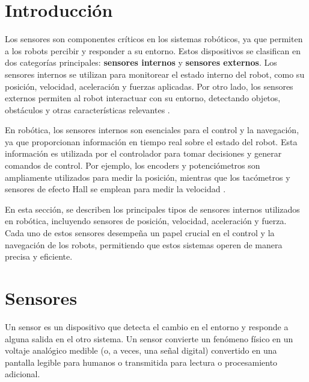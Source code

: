 \section{Introducción}

Los sensores son componentes críticos en los sistemas robóticos, ya que permiten a los robots percibir y responder a su entorno. Estos dispositivos se clasifican en dos categorías principales: \textbf{sensores internos} y \textbf{sensores externos}. Los sensores internos se utilizan para monitorear el estado interno del robot, como su posición, velocidad, aceleración y fuerzas aplicadas. Por otro lado, los sensores externos permiten al robot interactuar con su entorno, detectando objetos, obstáculos y otras características relevantes \cite{UAEMex}.

En robótica, los sensores internos son esenciales para el control y la navegación, ya que proporcionan información en tiempo real sobre el estado del robot. Esta información es utilizada por el controlador para tomar decisiones y generar comandos de control. Por ejemplo, los encoders y potenciómetros son ampliamente utilizados para medir la posición, mientras que los tacómetros y sensores de efecto Hall se emplean para medir la velocidad \cite{OMCH, EfectoHall}.

En esta sección, se describen los principales tipos de sensores internos utilizados en robótica, incluyendo sensores de posición, velocidad, aceleración y fuerza. Cada uno de estos sensores desempeña un papel crucial en el control y la navegación de los robots, permitiendo que estos sistemas operen de manera precisa y eficiente.


\section{Sensores}
Un sensor es un dispositivo que detecta el cambio en el entorno y responde a alguna salida en el otro sistema. Un sensor convierte un fenómeno físico en un voltaje analógico medible (o, a veces, una señal digital) convertido en una pantalla legible para humanos o transmitida para lectura o procesamiento adicional. 
